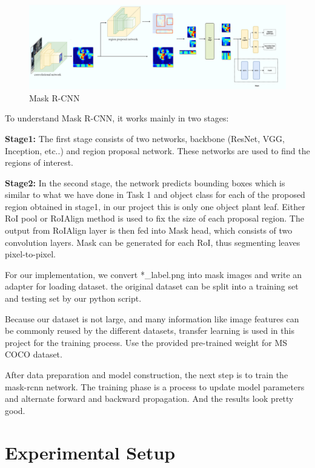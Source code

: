 \documentclass[conference]{IEEEtran}
\begin{document}
\begin{figure}[h!]
\centering
\includegraphics[width=\linewidth]{img/maskrcnn.png}
\caption{Mask R-CNN}
\label{fig_mask-rcnn}
\end{figure}

To understand Mask R-CNN, it works mainly in two stages:

\textbf{Stage1:} The first stage consists of two networks, backbone (ResNet, VGG, Inception, etc..) and region proposal network. These networks are used to find the regions of interest.

\textbf{Stage2:} In the second stage, the network predicts bounding boxes which is similar to what we have done in Task 1 and object class for each of the proposed region obtained in stage1, in our project this is only one object plant leaf. 
Either RoI pool or RoIAlign method is used to fix the size of each proposal region.
The output from RoIAlign layer is then fed into Mask head, which consists of two convolution layers.
Mask can be generated for each RoI, thus segmenting leaves pixel-to-pixel.

For our implementation, we convert *\_label.png into mask images and write an adapter for loading dataset.
the original dataset can be split into a training set and testing set by our python script.

Because our dataset is not large, and many information like image features can be commonly reused by the different datasets, 
transfer learning \cite{pan2009survey} is used in this project for the training process.
Use the provided pre-trained weight for MS COCO dataset\cite{Lin_2014}.

After data preparation and model construction, the next step is to train the mask-rcnn network.
The training phase is a process to update model parameters and alternate forward and backward propagation.
And the results look pretty good.

\section{Experimental Setup}
\end{document}
